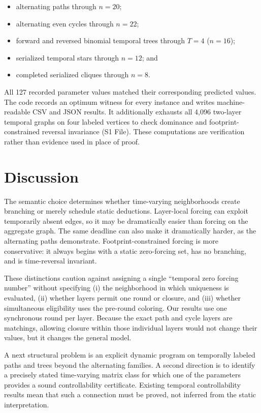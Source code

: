 \documentclass[11pt]{article}
\theoremstyle{definition}
\theoremstyle{remark}
\begin{document}
\begin{itemize}[leftmargin=*]
  \item alternating paths through $n=20$;
  \item alternating even cycles through $n=22$;
  \item forward and reversed binomial temporal trees through $T=4$
  ($n=16$);
  \item serialized temporal stars through $n=12$; and
  \item completed serialized cliques through $n=8$.
\end{itemize}

All 127 recorded parameter values matched their corresponding predicted
values.  The code
records an optimum witness for every instance and writes machine-readable
CSV and JSON results.  It additionally exhausts all 4,096 two-layer temporal graphs on
four labeled vertices to check dominance and footprint-constrained reversal
invariance (S1 File).  These computations are verification rather than evidence used
in place of proof.

\section{Discussion}

The semantic choice determines whether time-varying neighborhoods create
branching or merely schedule static deductions.  Layer-local forcing can
exploit temporarily absent edges, so it may be dramatically easier than
forcing on the aggregate graph.  The same deadline can also make it
dramatically harder, as the alternating paths demonstrate.
Footprint-constrained forcing is more conservative: it always begins with a
static zero-forcing set, has no branching, and is time-reversal invariant.

These distinctions caution against assigning a single ``temporal zero
forcing number'' without specifying (i) the neighborhood in which uniqueness
is evaluated, (ii) whether layers permit one round or closure, and (iii)
whether simultaneous eligibility uses the pre-round coloring.  Our results
use one synchronous round per layer.  Because the exact path and cycle layers
are matchings, allowing closure within those individual layers would not
change their values, but it changes the general model.

A next structural problem is an explicit dynamic program on temporally
labeled paths and trees beyond the alternating families.  A second direction
is to identify a precisely stated time-varying matrix class for which one of
the parameters provides a sound controllability certificate.  Existing
temporal controllability results mean that such a connection must be proved,
not inferred from the static interpretation.
\end{document}
